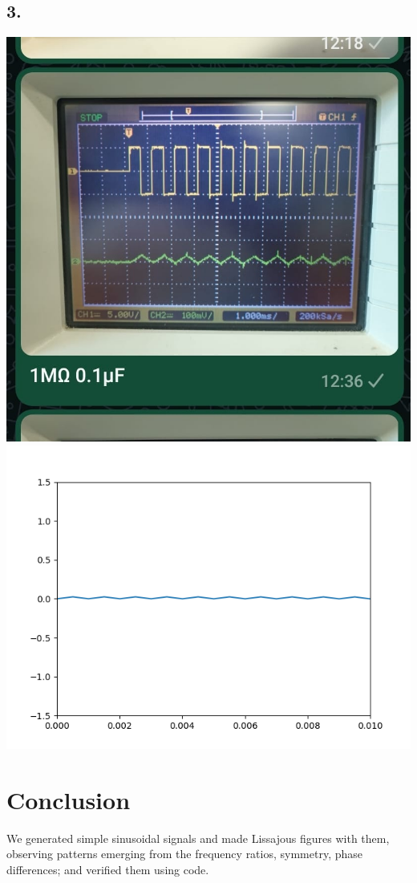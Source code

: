 \documentclass[a4paper,12pt]{article}
\begin{document}
  \subsection{3.}
	  \begin{center}
		  \includegraphics[width=0.5\columnwidth]{figs/RC=100T_exp_steady.jpg}\\
		  \includegraphics[width=0.4\columnwidth]{figs/RC=100T_sim.png}
	  \end{center}
\section{Conclusion}
We generated simple sinusoidal signals and made Lissajous figures with them, observing patterns emerging from the frequency ratios, symmetry, phase differences; and verified them using code.
\end{document}
